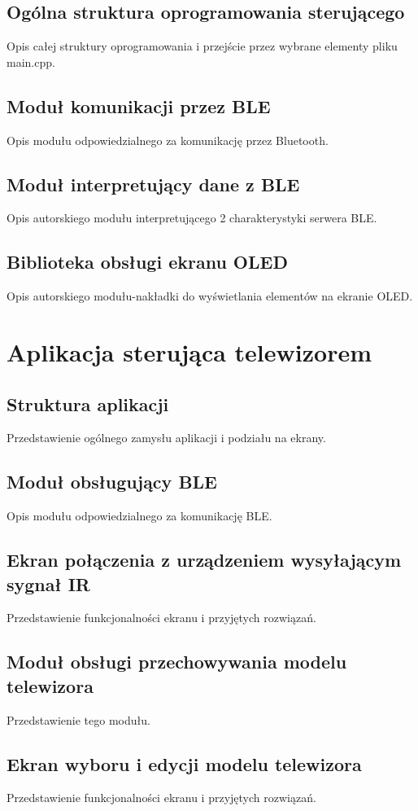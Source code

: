 \documentclass[12pt,twoside,draft]{article}
\begin{document}
\subsection{Ogólna struktura oprogramowania sterującego}
Opis całej struktury oprogramowania i przejście przez wybrane elementy pliku main.cpp.
\subsection{Moduł komunikacji przez BLE}
Opis modułu odpowiedzialnego za komunikację przez Bluetooth.
\subsection{Moduł interpretujący dane z BLE}
Opis autorskiego modułu interpretującego 2 charakterystyki serwera BLE.

\subsection{Biblioteka obsługi ekranu OLED}
Opis autorskiego modułu-nakładki do wyświetlania elementów na ekranie OLED.
\clearpage

\section{Aplikacja sterująca telewizorem}
\subsection{Struktura aplikacji}
Przedstawienie ogólnego zamysłu aplikacji i podziału na ekrany.
\subsection{Moduł obsługujący BLE}
Opis modułu odpowiedzialnego za komunikację BLE.
\subsection{Ekran połączenia z urządzeniem wysyłającym sygnał IR}
Przedstawienie funkcjonalności ekranu i przyjętych rozwiązań.
\subsection{Moduł obsługi przechowywania modelu telewizora}
Przedstawienie tego modułu.
\subsection{Ekran wyboru i edycji modelu telewizora}
Przedstawienie funkcjonalności ekranu i przyjętych rozwiązań.
\end{document}
